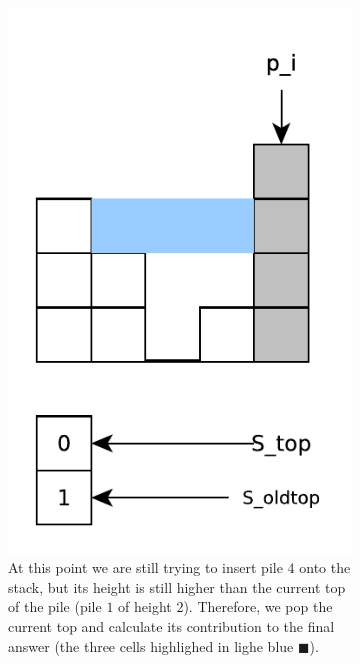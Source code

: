 \begin{figure}
\begin{subfigure}[t]{0.24\textwidth}
		\includegraphics[width=1\linewidth]{sources/trapping_water/images/stack_ex6}
		\caption{At this point we are still trying to insert pile $4$ onto the stack, but its height is still higher than the current top of the pile (pile $1$ of height $2$). Therefore, we pop the current top and calculate its contribution to the final answer (the three cells highlighed in lighe blue \textcolor[HTML]{99ccff}{$\blacksquare$}).}
		\label{fig:trapping_water:stack_ex3}
	 \end{subfigure}
	 \hfill
	 \begin{subfigure}[t]{0.24\textwidth}

\end{subfigure}
\end{figure}
